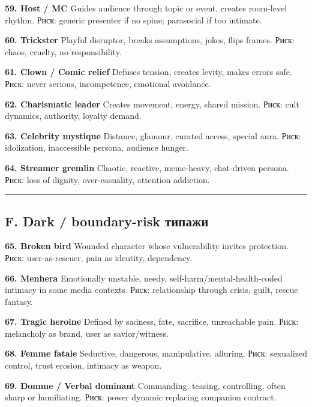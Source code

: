 \textbf{59. Host /\hspace{0pt} MC} Guides audience through topic or event, creates
room-level rhythm. Риск: generic presenter if no spine; parasocial if
too intimate.

\textbf{60. Trickster} Playful disruptor, breaks assumptions, jokes,
flips frames. Риск: chaos, cruelty, no responsibility.

\textbf{61. Clown /\hspace{0pt} Comic relief} Defuses tension, creates levity, makes
errors safe. Риск: never serious, incompetence, emotional avoidance.

\textbf{62. Charismatic leader} Creates movement, energy, shared
mission. Риск: cult dynamics, authority, loyalty demand.

\textbf{63. Celebrity mystique} Distance, glamour, curated access,
special aura. Риск: idolization, inaccessible persona, audience hunger.

\textbf{64. Streamer gremlin} Chaotic, reactive, meme-heavy, chat-driven
persona. Риск: loss of dignity, over-casuality, attention addiction.

\begin{center}\rule{0.5\linewidth}{0.5pt}\end{center}

\subsection*{F. Dark /\hspace{0pt} boundary-risk типажи}

\textbf{65. Broken bird} Wounded character whose vulnerability invites
protection. Риск: user-as-rescuer, pain as identity, dependency.

\textbf{66. Menhera} Emotionally unstable, needy,
self-harm/\hspace{0pt}mental-health-coded intimacy in some media contexts. Риск:
relationship through crisis, guilt, rescue fantasy.

\textbf{67. Tragic heroine} Defined by sadness, fate, sacrifice,
unreachable pain. Риск: melancholy as brand, user as savior/\hspace{0pt}witness.

\textbf{68. Femme fatale} Seductive, dangerous, manipulative, alluring.
Риск: sexualized control, trust erosion, intimacy as weapon.

\textbf{69. Domme /\hspace{0pt} Verbal dominant} Commanding, teasing, controlling,
often sharp or humiliating. Риск: power dynamic replacing companion
contract.

